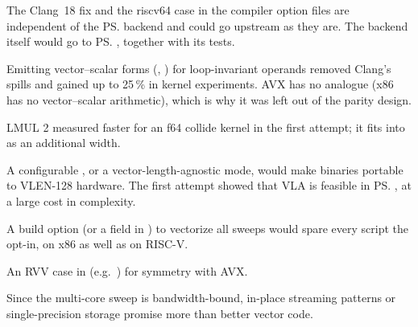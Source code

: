 \begin{description}[style=nextline]
  \item[Upstreaming] The Clang~18 fix and the riscv64  case in the compiler
    option files are independent of the \ps{} backend and could go upstream as they are.
    The backend itself would go to \ps{}, together with its tests.
  \item[Splat folding in the backend] Emitting vector--scalar forms (,
    ) for loop-invariant operands removed Clang's spills and gained up to
    25\,\% in kernel experiments. AVX has no analogue (x86 has no vector--scalar
    arithmetic), which is why it was left out of the parity design.
  \item[Register groups] LMUL 2 measured faster for an f64 collide kernel in the first
    attempt; it fits into  as an additional width.
  \item[Other VLENs] A configurable , or a vector-length-agnostic mode,
    would make binaries portable to VLEN-128 hardware. The first attempt showed that
    VLA is feasible in \ps{}, at a large cost in complexity.
  \item[A sweepgen option for vectorization] A build option (or a field in
    ) to vectorize all sweeps would spare every script the
    opt-in, on x86 as well as on RISC-V.
  \item[Alignment] An RVV case in  (e.g.\
    ) for symmetry with AVX.
  \item[Less memory traffic] Since the multi-core sweep is bandwidth-bound, in-place
    streaming patterns or single-precision storage promise more than better vector code.
\end{description}
